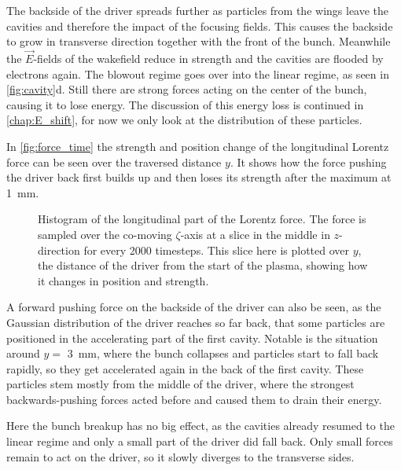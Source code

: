 \documentclass[bachelor_thesis]{subfiles}
\begin{document}
The backside of the driver spreads further as particles from the wings leave the cavities and therefore the impact of the focusing fields. This causes the backside to grow in transverse direction together with the front of the bunch. 
Meanwhile the $\vec{E}$-fields of the wakefield reduce in strength and the cavities are flooded by electrons again. The blowout regime goes over into the linear regime, as seen in \autoref{fig:cavity}d.
Still there are strong forces acting on the center of the bunch, causing it to lose energy. The discussion of this energy loss is continued in \autoref{chap:E_shift}, for now we only look at the distribution of these particles.

In \autoref{fig:force_time} the strength and position change of the longitudinal Lorentz force can be seen over the traversed distance $y$. It shows how the force pushing the driver back first builds up and then loses its strength after the maximum at \qty{1}{\mm}.
\begin{figure}
	\centering
	
	\caption{Histogram of the longitudinal part of the Lorentz force. The force is sampled over the co-moving $\zeta$-axis at a slice in the middle in $z$-direction for every 2000 timesteps. This slice here is plotted over $y$, the distance of the driver from the start of the plasma, showing how it changes in position and strength.}
	\label{fig:force_time}
\end{figure}
A forward pushing force on the backside of the driver can also be seen, as the Gaussian distribution of the driver reaches so far back, that some particles are positioned in the accelerating part of the first cavity.
Notable is the situation around $y=$ \qty{3}{mm}, where the bunch collapses and particles start to fall back rapidly, so they get accelerated again in the back of the first cavity. These particles stem mostly from the middle of the driver,
where the strongest backwards-pushing forces acted before and caused them to drain their energy. 

Here the bunch breakup has no big effect, as the cavities already resumed to the linear regime and only a small part of the driver did fall back. Only small forces remain to act on the driver, so it slowly diverges to the transverse sides.
\end{document}

